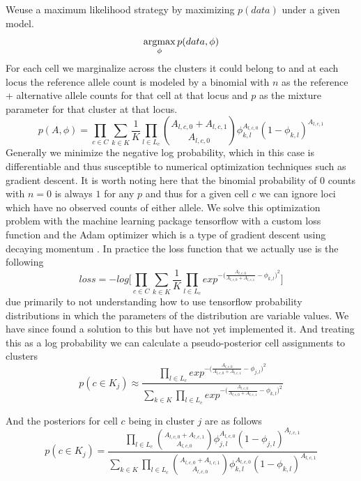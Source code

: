 Weuse a maximum likelihood strategy by maximizing $p(data)$ under a given model. 
\begin{equation}
\operatorname*{argmax}_{\phi} p(data, \phi)
\end{equation}
For each cell we marginalize across the clusters it could belong to and at each locus the reference allele count is modeled by a binomial with $n$ as the reference + alternative allele counts for that cell at that locus and $p$ as the mixture parameter for that cluster at that locus.
\begin{equation}
p(A,\phi) = \prod_{c \in C} \sum_{k \in K} \frac{1}{K} \prod_{l \in L_c}  \binom{A_{l,c,0} + A_{l,c,1}}{A_{l,c,0}} \phi_{k,l}^{A_{l,c,0}} (1-\phi_{k,l})^{A_{l,c,1}}
\end{equation}
Generally we minimize the negative log probability, which in this case is differentiable and thus susceptible to numerical optimization techniques such 
as gradient descent. It is worth noting here that the binomial probability of $0$ counts with $n=0$ is always $1$ for any $p$ and thus for a given cell $c$ we can ignore 
loci which have no observed counts of either allele. We solve this optimization problem with the machine learning package tensorflow with a custom loss function and 
the Adam optimizer which is a type of gradient descent using decaying momentum \cite{ADAM}. In practice 
the loss function that we actually use is the following 
\begin{equation}
loss = -log\bigg[\prod_{c \in C} \sum_{k \in K} \frac{1}{K} \prod_{l \in L_c} exp^{-\bigg(\frac{A_{l,c,0}}{A_{l,c,0}+A_{l,c,1}} - \phi_{k,l}\bigg)^2}\bigg]
\end{equation}
due primarily to not understanding how to use tensorflow probability distributions in which the parameters of the distribution are variable values. 
We have since found a solution to this but have not yet implemented it.
And treating this as a log probability we can calculate a pseudo-posterior cell assignments to clusters
\begin{equation}
p(c \in K_j) \approx \frac{\prod_{l \in L_c} exp^{-\bigg(\frac{A_{l,c,0}}{A_{l,c,0}+A_{l,c,1}} - \phi_{j,l}\bigg)^2}}{\sum_{k \in K} \prod_{l \in L_c} exp^{-\bigg(\frac{A_{l,c,0}}{A_{l,c,0}+A_{l,c,1}} - \phi_{k,l}\bigg)^2}}
\end{equation}

And the posteriors for cell $c$ being in cluster $j$ are as follows
\begin{equation}
p(c \in K_j) = \frac{\prod_{l \in L_c}  \binom{A_{l,c,0} + A_{l,c,1}}{A_{l,c,0}} \phi_{j,l}^{A_{l,c,0}}(1-\phi_{j,l})^{A_{l,c,1}}}{\sum_{k \in K} \prod_{l \in L_c}  \binom{A_{l,c,0} + A_{l,c,1}}{A_{l,c,0}} \phi_{k,l}^{A_{l,c,0}}(1-\phi_{k,l})^{A_{l,c,1}}}
\end{equation}

